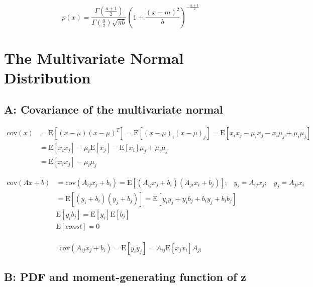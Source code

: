 \documentclass[12pt]{article}
\begin{document}
        \begin{equation}
              p(x) = \frac{\Gamma \left( \frac{a+1}{2}\right)}{\Gamma(\frac{a}{2})\sqrt{\pi b}} \left (1 + \frac{(x-m)^2}{b}\right)^{-\frac{a+1}{2}}
        \end{equation}


    \section*{The Multivariate Normal Distribution}

    \subsection*{A: Covariance of the multivariate normal}

        \begin{align}
            \text{cov}(x) &= \text{E}[(x-\mu)(x-\mu)^T ] = \text{E}[(x-\mu)_i (x-\mu)_j] = \text{E}[ x_i x_j - \mu_i x_j - x_i \mu_j + \mu_i \mu_j] \\
                &= \text{E}[x_i x_j] - \mu_i \text{E}[x_j] - \text{E}[x_i] \mu_j + \mu_i \mu_j \\
                &= \text{E}[x_i x_j] - \mu_i \mu_j
        \end{align}

        \begin{align}
            \text{cov}(Ax+b) &= \text{cov}(A_{ij}x_j + b_i) = \text{E}[(A_{ij}x_j + b_i)(A_{ji}x_i + b_j)]; \hspace{10pt} y_i = A_{ij}x_j; \hspace{10pt} y_j = A_{ji} x_i \\
            &= \text{E}[(y_i + b_i)(y_j + b_j)] = \text{E}[y_i y_j + y_i b_j + b_i y_j + b_i b_j] \\
            &\text{E}[y_i b_j] = \text{E}[y_i] \text{E}[b_j] \\
            &\text{E}[const] = 0 \\
        \end{align}

        \begin{equation}
            \text{cov}(A_{ij}x_j + b_i) = \text{E}[y_i y_j] = A_{ij} \text{E}[x_j x_i] A_{ji}
        \end{equation}

    \subsection*{B: PDF and moment-generating function of z}
\end{document}
